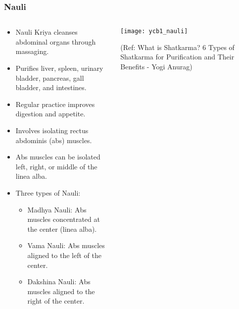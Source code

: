 \begin{frame}[fragile]\frametitle{Nauli}
\begin{columns}
    \begin{column}[T]{0.5\linewidth}
      \begin{itemize}
          \item Nauli Kriya cleanses abdominal organs through massaging.
          \item Purifies liver, spleen, urinary bladder, pancreas, gall bladder, and intestines.
          \item Regular practice improves digestion and appetite.
          \item Involves isolating rectus abdominis (abs) muscles.
          \item Abs muscles can be isolated left, right, or middle of the linea alba.
          \item Three types of Nauli:
            \begin{itemize}
              \item Madhya Nauli: Abs muscles concentrated at the center (linea alba).
              \item Vama Nauli: Abs muscles aligned to the left of the center.
              \item Dakshina Nauli: Abs muscles aligned to the right of the center.
            \end{itemize}
      \end{itemize}
    \end{column}
    \begin{column}[T]{0.5\linewidth}
        \begin{center}
        \texttt{[image: ycb1\_nauli]}
		
		{\tiny (Ref: What is Shatkarma? 6 Types of Shatkarma for Purification and Their Benefits - Yogi Anurag)}	
        \end{center}	
    \end{column}
\end{columns}	  
\end{frame}

